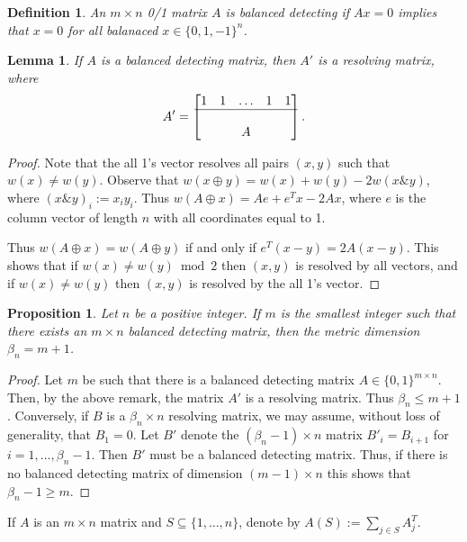 \documentclass{article}
\newtheorem{definition}{Definition}
\newtheorem{lemma}{Lemma}
\newtheorem{proposition}{Proposition}
\begin{document}
\begin{definition}
  An $m \times n$ 0/1 matrix $A$ is \emph{balanced detecting} if $A x
  = 0$ implies that $x = 0$ for all balanaced $x \in \{0,1,-1\}^n$.
\end{definition}
\begin{lemma}
  If $A$ is a balanced detecting matrix, then $A'$ is a resolving
  matrix, where
  \begin{displaymath}
    A' =
    \begin{bmatrix}
      1 & 1 & \hdots & 1& 1 \\
      \hline \\
      & & A
    \end{bmatrix}.
  \end{displaymath}
\end{lemma}
\begin{proof}
  Note that the all 1's vector resolves all pairs $(x,y)$ such that
  $w(x) \ne w(y)$.  Observe that $w(x \oplus y) = w(x) + w(y) - 2 w(x
  \& y)$, where $(x \& y)_i := x_i y_i$.  Thus
  $w(A \oplus x) = A e + e^T x - 2 A x$, where $e$ is the column
  vector of length $n$ with all coordinates equal to 1.

  Thus $w(A \oplus x) = w(A \oplus y)$ if and only if
  $e^T(x-y) = 2 A (x-y)$.  This shows that if $w(x) \ne w(y) \bmod 2$
  then $(x,y)$ is resolved by all vectors, and if $w(x) \ne w(y)$ then
  $(x,y)$ is resolved by the all 1's vector.
\end{proof}
\begin{proposition}
Let $n$ be a positive integer.  If $m$ is the smallest integer such
that there exists an $m \times n$ balanced detecting matrix, then the
metric dimension $\beta_n = m + 1$.
\end{proposition}
\begin{proof}
  Let $m$ be such that there is a balanced detecting matrix $A \in
  \{0,1\}^{m \times n}$. Then, by the above remark,
    the matrix $A'$ is a resolving matrix.  Thus $\beta_n \le m+1$.
    Conversely, if $B$ is a $\beta_n \times n$ resolving matrix, we
    may assume, without loss of generality, that $B_1 = 0$.  Let $B'$
    denote the $(\beta_n - 1) \times n$ matrix $B'_i = B_{i+1}$ for
    $i=1, \dots, \beta_n - 1$.  Then $B'$ must be a balanced detecting
    matrix. Thus, if there is no balanced detecting
    matrix of dimension $(m-1) \times n$ this shows that $\beta_n - 1
    \ge m$.
\end{proof}
If $A$ is an $m \times n$ matrix and $S \subseteq \{1, \dots, n\}$,
denote by $A(S) := \sum_{j \in S} A^T_j$.
\end{document}
